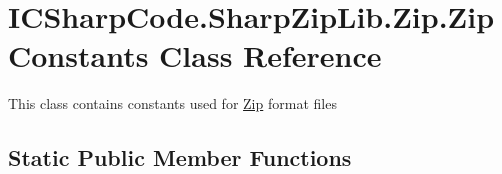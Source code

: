 \hypertarget{class_i_c_sharp_code_1_1_sharp_zip_lib_1_1_zip_1_1_zip_constants}{}\section{I\+C\+Sharp\+Code.\+Sharp\+Zip\+Lib.\+Zip.\+Zip\+Constants Class Reference}
\label{class_i_c_sharp_code_1_1_sharp_zip_lib_1_1_zip_1_1_zip_constants}


This class contains constants used for \hyperlink{namespace_i_c_sharp_code_1_1_sharp_zip_lib_1_1_zip}{Zip} format files  


\subsection*{Static Public Member Functions}
